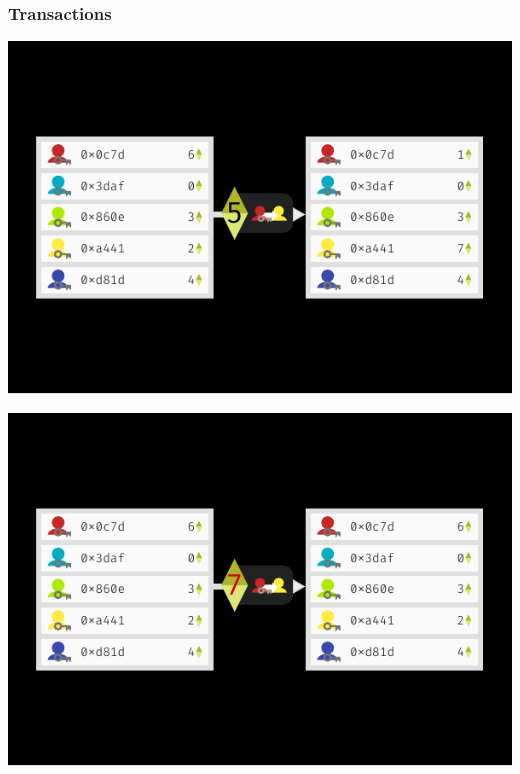 \documentclass[xcolor=x11names,compress]{beamer}
\begin{document}
\begin{frame}
	\frametitle{Transactions}
	\begin{overprint}
		\begin{center}
			\includegraphics[width=\textwidth,height=0.8\textheight,keepaspectratio]{img/state/02.pdf}
		\end{center}
		\begin{center}
			\includegraphics[width=\textwidth,height=0.8\textheight,keepaspectratio]{img/state/03.pdf}
		\end{center}
		\begin{center}

\end{center}
\end{overprint}
\end{frame}
\end{document}
